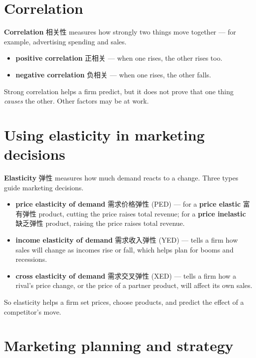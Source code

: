 \documentclass[11pt]{article}
\begin{document}
\section*{Correlation}

\textbf{Correlation} 相关性 measures how strongly two things move together — for example, advertising spending and sales.

\begin{itemize}
\item \textbf{positive correlation} 正相关 — when one rises, the other rises too.

\item \textbf{negative correlation} 负相关 — when one rises, the other falls.

\end{itemize}

Strong correlation helps a firm predict, but it does not prove that one thing \emph{causes} the other. Other factors may be at work.

\section*{Using elasticity in marketing decisions}

\textbf{Elasticity} 弹性 measures how much demand reacts to a change. Three types guide marketing decisions.

\begin{itemize}
\item \textbf{price elasticity of demand} 需求价格弹性 (PED) — for a \textbf{price elastic} 富有弹性 product, cutting the price raises total revenue; for a \textbf{price inelastic} 缺乏弹性 product, raising the price raises total revenue.

\item \textbf{income elasticity of demand} 需求收入弹性 (YED) — tells a firm how sales will change as incomes rise or fall, which helps plan for booms and recessions.

\item \textbf{cross elasticity of demand} 需求交叉弹性 (XED) — tells a firm how a rival's price change, or the price of a partner product, will affect its own sales.

\end{itemize}

So elasticity helps a firm set prices, choose products, and predict the effect of a competitor's move.

\section*{Marketing planning and strategy}
\end{document}
